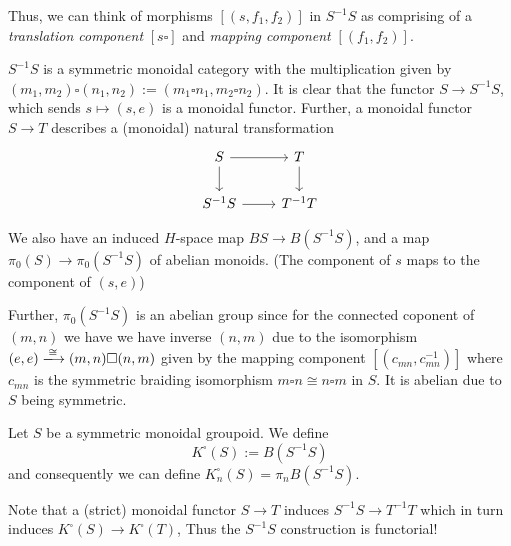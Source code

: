Thus, we can think of morphisms $[(s,f_1,f_2)]$ in $S^{-1}S$ as comprising of a \emph{translation component} $[s \square]$ and
\emph{mapping component} $[(f_1,f_2)]$.

\begin{remark}
$S^{-1}S$ is a symmetric monoidal category with the multiplication given by $(m_1,m_2) \square (n_1, n_2) := (m_1 \square n_1, m_2 \square n_2)$.
It is clear that the functor $S \to S^{-1}S$, which sends $s \mapsto (s,e)$ is a monoidal functor.
Further, a monoidal functor $S \to T$ describes a (monoidal) natural transformation
\[
\begin{tikzcd}
S \arrow[r] \arrow[d] & T \arrow[d] \\
S^{-1}S \arrow[r] & T^{-1}T
\end{tikzcd}
\]

We also have an induced $H$-space map $BS \to B(S^{-1}S)$, and a map $\pi_0(S) \to \pi_0(S^{-1}S)$
of abelian monoids. (The component of $s$ maps to the component of $(s,e)$)

Further, $\pi_0(S^{-1}S)$ is an abelian group since for the connected coponent of $(m,n)$ we have we have inverse $(n,m)$
due to the isomorphism $(e,e) \xlongrightarrow{\cong} (m,n) \square (n,m)$
given by the mapping component $[(c_{mn},c^{-1}_{mn})]$ where $c_{mn}$ is the symmetric braiding isomorphism $m \square n \cong n \square m$ in $S$.
It is abelian due to $S$ being symmetric.

\end{remark}

\begin{definition}
Let $S$ be a symmetric monoidal groupoid. We define
\[
K^\square(S) := B(S^{-1}S)
\]
and consequently we can define
$K^\square_n(S) = \pi_n B(S^{-1}S)$.

\end{definition}
Note that a (strict) monoidal functor $S \to T$ induces $S^{-1}S \to T^{-1}T$ which in turn induces $K^\square(S) \to K^\square(T)$,
Thus the $S^{-1}S$ construction is functorial!


